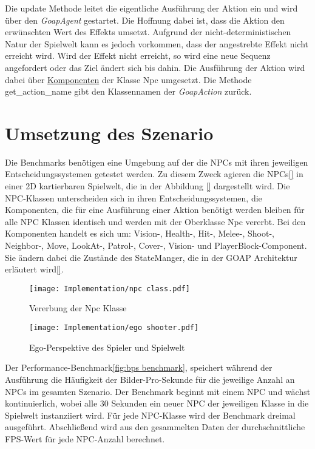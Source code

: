 Die update Methode leitet die eigentliche Ausführung der Aktion ein und wird über den \textit{GoapAgent} gestartet. Die Hoffnung dabei ist, dass die Aktion den erwünschten Wert des Effekts umsetzt. Aufgrund der nicht-deterministischen Natur der Spielwelt kann es jedoch vorkommen, dass der angestrebte Effekt nicht erreicht wird. Wird der Effekt nicht erreicht, so wird eine neue Sequenz angefordert oder das Ziel ändert sich bis dahin. Die Ausführung der Aktion wird dabei über \hyperref[chap:game-objects]{Komponenten} der Klasse Npc umgesetzt. Die Methode get\_action\_name gibt den Klassennamen der \textit{GoapAction} zurück.


\section{Umsetzung des Szenario}
\label{chap:implementierung szenario}

Die Benchmarks benötigen eine Umgebung auf der die NPCs mit ihren jeweiligen Entscheidungssystemen getestet werden. Zu diesem Zweck agieren die NPCs\ref{} in einer 2D kartierbaren Spielwelt, die in der Abbildung \ref{} dargestellt wird. Die NPC-Klassen unterscheiden sich in ihren Entscheidungssystemen, die Komponenten, die für eine Ausführung einer Aktion benötigt werden bleiben für alle NPC Klassen identisch und werden mit der Oberklasse Npc vererbt. Bei den Komponenten handelt es sich um: Vision-, Health-, Hit-, Melee-, Shoot-, Neighbor-, Move, LookAt-, Patrol-, Cover-, Vision- und PlayerBlock-Component. Sie ändern dabei die Zustände des StateManger, die in der GOAP Architektur erläutert wird\ref{}.

\begin{figure}[h]
  \centering
  \texttt{[image: Implementation/npc class.pdf]}
	\captionsetup{justification=justified, format=plain}
  \caption{Vererbung der Npc Klasse}
  \label{fig:npc class}
\end{figure}

\begin{figure}[h]
  \centering
  \texttt{[image: Implementation/ego shooter.pdf]}
	\captionsetup{justification=justified, format=plain}
  \caption{Ego-Perspektive des Spieler und Spielwelt}
  \label{fig:ego shooter}
\end{figure}

Der Performance-Benchmark\ref{fig:bps benchmark}, speichert während der Ausführung die Häufigkeit der Bilder-Pro-Sekunde für die jeweilige Anzahl an NPCs im gesamten Szenario. Der Benchmark beginnt mit einem NPC und wächst kontinuierlich, wobei alle 30 Sekunden ein neuer NPC der jeweiligen Klasse in die Spielwelt instanziiert wird. Für jede NPC-Klasse wird der Benchmark dreimal ausgeführt. Abschlie\ss{}end wird aus den gesammelten Daten der durchschnittliche FPS-Wert für jede NPC-Anzahl berechnet.

